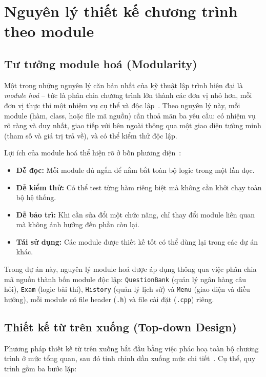 \documentclass[11pt]{report}
\begin{document}
\section{Nguyên lý thiết kế chương trình theo module}

\subsection{Tư tưởng module hoá (Modularity)}

Một trong những nguyên lý căn bản nhất của kỹ thuật lập trình hiện đại là \textit{module hoá} -- tức là phân chia chương trình lớn thành các đơn vị nhỏ hơn, mỗi đơn vị thực thi một nhiệm vụ cụ thể và độc lập~\cite{nam2022}. Theo nguyên lý này, mỗi module (hàm, class, hoặc file mã nguồn) cần thoả mãn ba yêu cầu: có nhiệm vụ rõ ràng và duy nhất, giao tiếp với bên ngoài thông qua một giao diện tường minh (tham số và giá trị trả về), và có thể kiểm thử độc lập.

Lợi ích của module hoá thể hiện rõ ở bốn phương diện~\cite{nam2022}:
\begin{itemize}[leftmargin=*]
    \item \textbf{Dễ đọc:} Mỗi module đủ ngắn để nắm bắt toàn bộ logic trong một lần đọc.
    \item \textbf{Dễ kiểm thử:} Có thể test từng hàm riêng biệt mà không cần khởi chạy toàn bộ hệ thống.
    \item \textbf{Dễ bảo trì:} Khi cần sửa đổi một chức năng, chỉ thay đổi module liên quan mà không ảnh hưởng đến phần còn lại.
    \item \textbf{Tái sử dụng:} Các module được thiết kế tốt có thể dùng lại trong các dự án khác.
\end{itemize}

Trong dự án này, nguyên lý module hoá được áp dụng thông qua việc phân chia mã nguồn thành bốn module độc lập: \texttt{QuestionBank} (quản lý ngân hàng câu hỏi), \texttt{Exam} (logic bài thi), \texttt{History} (quản lý lịch sử) và \texttt{Menu} (giao diện và điều hướng), mỗi module có file header (\texttt{.h}) và file cài đặt (\texttt{.cpp}) riêng.

\subsection{Thiết kế từ trên xuống (Top-down Design)}

Phương pháp thiết kế từ trên xuống bắt đầu bằng việc phác hoạ toàn bộ chương trình ở mức tổng quan, sau đó tinh chỉnh dần xuống mức chi tiết~\cite{nam2022}. Cụ thể, quy trình gồm ba bước lặp:
\end{document}
